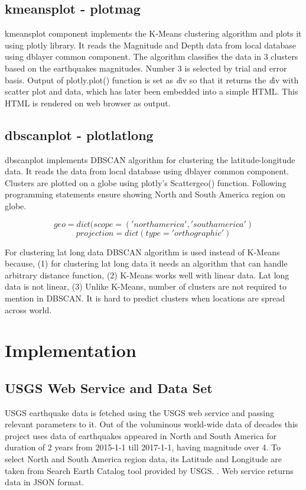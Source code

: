 \documentclass[9pt,twocolumn,twoside]{../../styles/osajnl}
\begin{document}
\subsection{kmeansplot - plotmag}
kmeansplot component implements the K-Means clustering algorithm and plots it using plotly library. It reads the Magnitude and Depth data from local database using dblayer common component. The algorithm classifies the data in 3 clusters based on the earthquakes magnitudes. Number 3 is selected by trial and error basis. 
Output of plotly.plot() function is set as \emph div so that it returns the \emph div with scatter plot and data, which has later been embedded into a simple HTML. This HTML is rendered on web browser as output.

\subsection{dbscanplot - plotlatlong}
dbscanplot implements DBSCAN algorithm for clustering the latitude-longitude data. It reads the data from local database using dblayer common component. 
Clusters are plotted on a globe using plotly's Scattergeo() function. Following programming statements ensure showing North and South America region on globe.

\[ geo=dict(scope=('north america', 'south america') \]
\[projection=dict(type='orthographic') \]

For clustering lat long data DBSCAN algorithm is used instead of K-Means because, (1) for clustering lat long data it needs an algorithm that can handle arbitrary distance function, (2) K-Means works well with linear data. Lat long data is not linear, (3) Unlike K-Means, number of clusters are not required to mention in DBSCAN. It is hard to predict clusters when locations are spread across world.

\section{Implementation}

\subsection{USGS Web Service and Data Set}
USGS earthquake data is fetched using the USGS web service and passing relevant parameters to it. Out of the voluminous world-wide data of decades this project uses data of earthquakes appeared in North and South America for duration of 2 years from 2015-1-1 till 2017-1-1, having magnitude over 4. To select North and South America region data, its Latitude and Longitude are taken from Search Earth Catalog tool provided by USGS. \cite{www-usgs3}. Web service returns data in JSON format.
\end{document}
